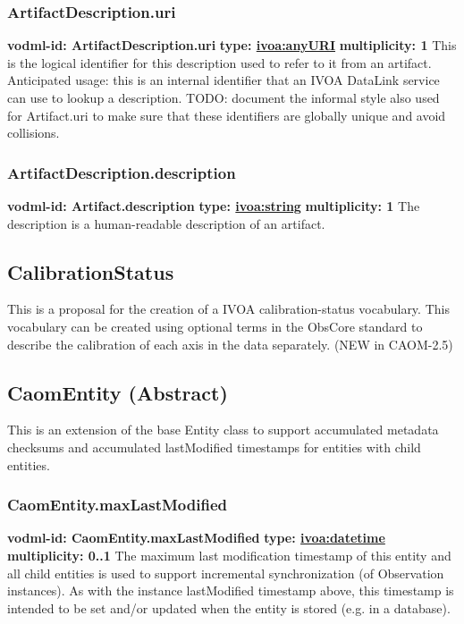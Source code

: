     \subsubsection{ArtifactDescription.uri}
      \textbf{vodml-id: ArtifactDescription.uri} \newline
      \textbf{type: \hyperref[sect:ivoa]{ivoa:anyURI}} \newline
      \textbf{multiplicity: 1} \newline
      This is the logical identifier for this description used to refer to it from an artifact. Anticipated usage: this is an internal identifier that an IVOA DataLink service can use to lookup a description. TODO: document the informal style also used for Artifact.uri to make sure that these identifiers are globally unique and avoid collisions.

    \subsubsection{ArtifactDescription.description}
      \textbf{vodml-id: Artifact.description} \newline
      \textbf{type: \hyperref[sect:ivoa]{ivoa:string}} \newline
      \textbf{multiplicity: 1} \newline
      The description is a human-readable description of an artifact.

  \subsection{CalibrationStatus}
  \label{sect:CalibrationStatus}
    This is a proposal for the creation of a IVOA calibration-status vocabulary. This vocabulary can be created using optional terms in the ObsCore standard to describe the calibration of each axis in the data separately. (NEW in CAOM-2.5)

  \subsection{CaomEntity (Abstract)}
  \label{sect:CaomEntity}
    This is an extension of the base Entity class to support accumulated metadata checksums and accumulated lastModified timestamps for entities with child entities.

    \subsubsection{CaomEntity.maxLastModified}
      \textbf{vodml-id: CaomEntity.maxLastModified} \newline
      \textbf{type: \hyperref[sect:ivoa]{ivoa:datetime}} \newline
      \textbf{multiplicity: 0..1} \newline
      The maximum last modification timestamp of this entity and all child entities is used to support incremental synchronization (of Observation instances). As with the instance lastModified timestamp above, this timestamp is intended to be set and/or updated when the entity is stored (e.g. in a database).

